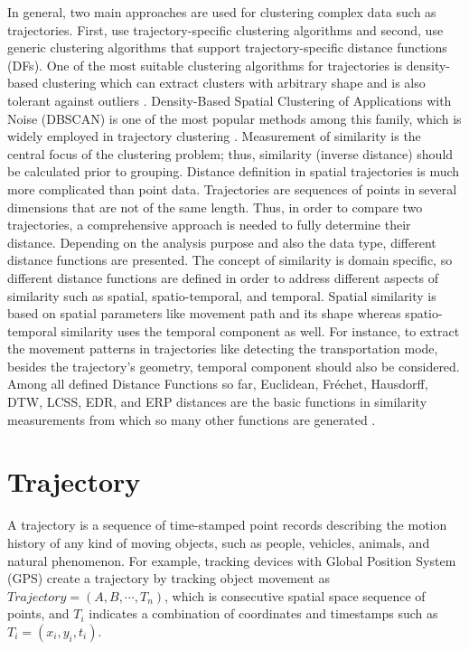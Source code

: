 \documentclass[a4paper, 12pt]{article}
\begin{document}
In general, two main approaches are used for clustering complex data such as trajectories. First, use trajectory-specific clustering algorithms and second, use generic clustering algorithms that support trajectory-specific distance functions (DFs). One of the most suitable clustering algorithms for trajectories is density-based clustering \citep{kriegel2011density} which can extract clusters with arbitrary shape and is also tolerant against outliers \citep{ester1996density}. Density-Based Spatial Clustering of Applications with Noise (DBSCAN) is one of the most popular methods among this family, which is widely employed in trajectory clustering \citep{zhao2019trajectory,cheng2018density,chen2011clustering,lee2007trajectory}. Measurement of similarity is the central focus of the clustering problem; thus, similarity (inverse distance) should be calculated prior to grouping. Distance definition in spatial trajectories is much more complicated than point data. Trajectories are sequences of points in several dimensions that are not of the same length. Thus, in order to compare two trajectories, a comprehensive approach is needed to fully determine their distance. Depending on the analysis purpose and also the data type, different distance functions are presented. The concept of similarity is domain specific, so different distance functions are defined in order to address different aspects of similarity such as spatial, spatio-temporal, and temporal. Spatial similarity is based on spatial parameters like movement path and its shape whereas spatio-temporal similarity uses the temporal component as well. For instance, to extract the movement patterns in trajectories like detecting the transportation mode, besides the trajectory’s geometry, temporal component should also be considered. Among all defined Distance Functions so far, Euclidean, Fréchet, Hausdorff, DTW, LCSS, EDR, and ERP distances are the basic functions in similarity measurements from which so many other functions are generated \citep{abbaspour2017method,aghabozorgi2015time,wang2013effectiveness}.

\section{Trajectory}
A trajectory is a sequence of time-stamped point records describing the motion history of any kind of moving objects, such as people, vehicles, animals, and natural phenomenon. For example, tracking devices with Global Position System (GPS) create a trajectory by tracking object movement as $Trajectory=(A,B,\cdots,T_{n})$, which is consecutive spatial space sequence of points, and $T_{i}$ indicates a combination of coordinates and timestamps such as $T_i=(x_{i},y_{i},t_{i})$.
\end{document}
